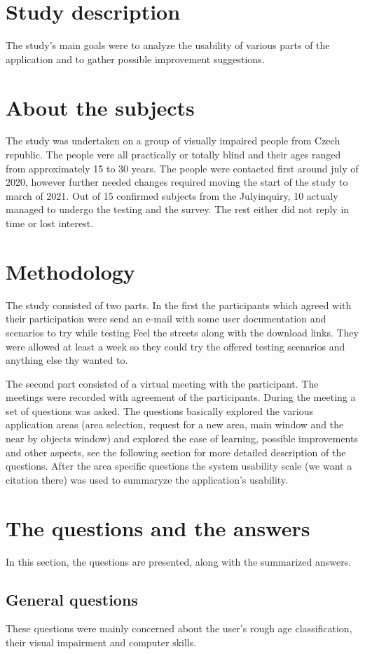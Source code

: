 \documentclass[nolof,digital]{fithesis3}
\begin{document}
\section{Study description}
The study's main goals were to analyze the usability of various parts of the application and to gather possible improvement suggestions.
\section{About the subjects}
The study was undertaken on a group of visually impaired people from Czech republic. The people vere all practically or totally blind and their ages ranged from approximately 15 to 30 years. The people were contacted first around july of 2020, however further needed changes required moving the start of the study to march of 2021. Out of 15 confirmed subjects from the Julyinquiry, 10 actualy managed to undergo the testing and the survey. The rest either did not reply in time or lost interest.
\section{Methodology}
The study consisted of two parts. In the first the participants which agreed with their participation were send an e-mail with some user documentation and scenarios to try while testing Feel the streets along with the download links. They were allowed at least a week so they could try the offered testing scenarios and anything else thy wanted to.

The second part consisted of a virtual meeting with the participant. The meetings were recorded with agreement of the participants. During the meeting a set of questions was asked. The questions basically explored the various application areas (area selection, request for a new area, main window and the near by objects window) and explored the ease of learning, possible improvements and other aspects, see the following section for more detailed description of the questions. After the area specific questions the system usability scale (we want a citation there) was used to summaryze the application's usability.
\section{The questions and the answers}
In this section, the questions are presented, along with the summarized answers.
\subsection{General questions}
These questions were mainly concerned about the user's rough age classification, their visual impairment and computer skills.
\end{document}
